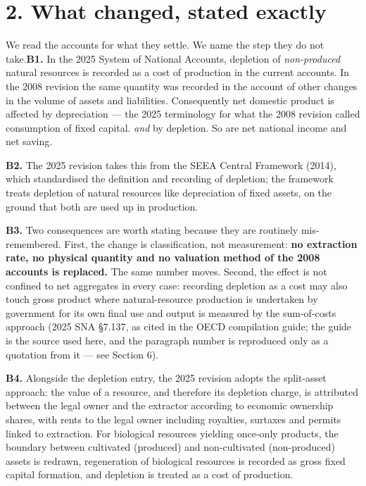 \documentclass[11pt]{article}
\begin{document}
\vspace{0.8em}

\section*{2. What changed, stated exactly}\label{2-what-changed-stated-exactly}

We read the accounts for what they settle. We name the step they do not take.\textbf{B1.} In the 2025 System of National Accounts, depletion of \emph{non-produced} natural resources is recorded as a cost of production in the current accounts. In the 2008 revision the same quantity was recorded in the account of other changes in the volume of assets and liabilities. Consequently net domestic product is affected by depreciation --- the 2025 terminology for what the 2008 revision called consumption of fixed capital. \emph{and} by depletion. So are net national income and net saving.

\textbf{B2.} The 2025 revision takes this from the SEEA Central Framework (2014), which standardised the definition and recording of depletion; the framework treats depletion of natural resources like depreciation of fixed assets, on the ground that both are used up in production.

\textbf{B3.} Two consequences are worth stating because they are routinely mis-remembered. First, the change is classification, not measurement: \textbf{no extraction rate, no physical quantity and no valuation method of the 2008 accounts is replaced.} The same number moves. Second, the effect is not confined to net aggregates in every case: recording depletion as a cost may also touch gross product where natural-resource production is undertaken by government for its own final use and output is measured by the sum-of-costs approach (2025 SNA \S7.137, as cited in the OECD compilation guide; the guide is the source used here, and the paragraph number is reproduced only as a quotation from it --- see Section 6).

\textbf{B4.} Alongside the depletion entry, the 2025 revision adopts the split-asset approach: the value of a resource, and therefore its depletion charge, is attributed between the legal owner and the extractor according to economic ownership shares, with rents to the legal owner including royalties, surtaxes and permits linked to extraction. For biological resources yielding once-only products, the boundary between cultivated (produced) and non-cultivated (non-produced) assets is redrawn, regeneration of biological resources is recorded as gross fixed capital formation, and depletion is treated as a cost of production.
\end{document}
